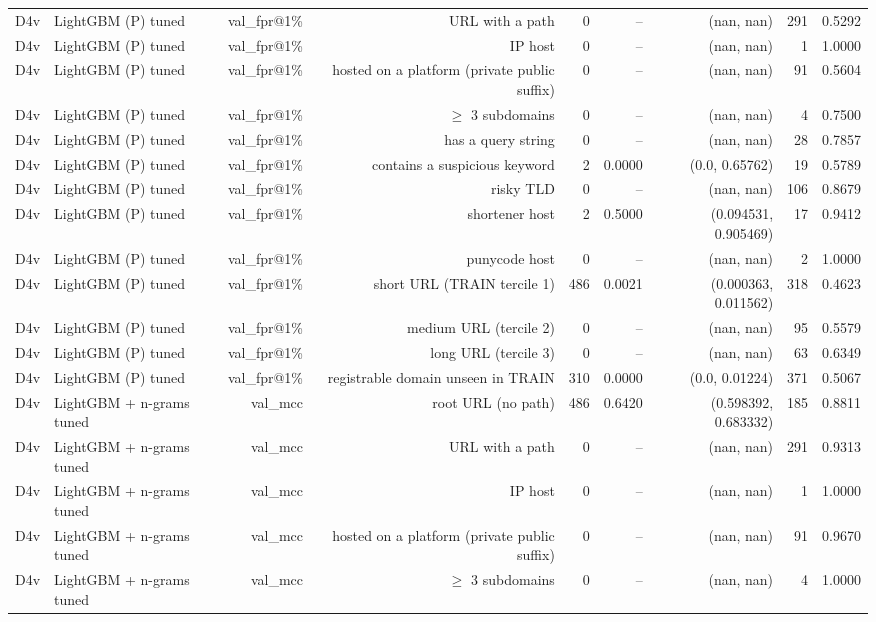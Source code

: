 \begin{table}[t]
\begin{tabular}{llrrrrrrr}
D4v & LightGBM (P) tuned & val\_fpr@1\% & URL with a path & 0 & -- & (nan, nan) & 291 & 0.5292 \\
D4v & LightGBM (P) tuned & val\_fpr@1\% & IP host & 0 & -- & (nan, nan) & 1 & 1.0000 \\
D4v & LightGBM (P) tuned & val\_fpr@1\% & hosted on a platform (private public suffix) & 0 & -- & (nan, nan) & 91 & 0.5604 \\
D4v & LightGBM (P) tuned & val\_fpr@1\% & $\geq$ 3 subdomains & 0 & -- & (nan, nan) & 4 & 0.7500 \\
D4v & LightGBM (P) tuned & val\_fpr@1\% & has a query string & 0 & -- & (nan, nan) & 28 & 0.7857 \\
D4v & LightGBM (P) tuned & val\_fpr@1\% & contains a suspicious keyword & 2 & 0.0000 & (0.0, 0.65762) & 19 & 0.5789 \\
D4v & LightGBM (P) tuned & val\_fpr@1\% & risky TLD & 0 & -- & (nan, nan) & 106 & 0.8679 \\
D4v & LightGBM (P) tuned & val\_fpr@1\% & shortener host & 2 & 0.5000 & (0.094531, 0.905469) & 17 & 0.9412 \\
D4v & LightGBM (P) tuned & val\_fpr@1\% & punycode host & 0 & -- & (nan, nan) & 2 & 1.0000 \\
D4v & LightGBM (P) tuned & val\_fpr@1\% & short URL (TRAIN tercile 1) & 486 & 0.0021 & (0.000363, 0.011562) & 318 & 0.4623 \\
D4v & LightGBM (P) tuned & val\_fpr@1\% & medium URL (tercile 2) & 0 & -- & (nan, nan) & 95 & 0.5579 \\
D4v & LightGBM (P) tuned & val\_fpr@1\% & long URL (tercile 3) & 0 & -- & (nan, nan) & 63 & 0.6349 \\
D4v & LightGBM (P) tuned & val\_fpr@1\% & registrable domain unseen in TRAIN & 310 & 0.0000 & (0.0, 0.01224) & 371 & 0.5067 \\
D4v & LightGBM + n-grams tuned & val\_mcc & root URL (no path) & 486 & 0.6420 & (0.598392, 0.683332) & 185 & 0.8811 \\
D4v & LightGBM + n-grams tuned & val\_mcc & URL with a path & 0 & -- & (nan, nan) & 291 & 0.9313 \\
D4v & LightGBM + n-grams tuned & val\_mcc & IP host & 0 & -- & (nan, nan) & 1 & 1.0000 \\
D4v & LightGBM + n-grams tuned & val\_mcc & hosted on a platform (private public suffix) & 0 & -- & (nan, nan) & 91 & 0.9670 \\
D4v & LightGBM + n-grams tuned & val\_mcc & $\geq$ 3 subdomains & 0 & -- & (nan, nan) & 4 & 1.0000 \\

\end{tabular}
\end{table}
